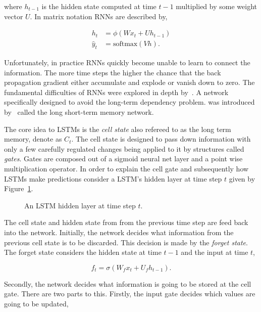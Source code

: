 where \(h_{t-1}\) is the hidden state computed at time \(t-1\) multiplied by
some weight vector \(U\). In matrix notation RNNs are described by,

\begin{align}\label{eq:recurrent_neural_network_equations}
    h_t & = \phi(Wx_t + Uh_{t-1}) \\
    \hat{y}_t & = \text{softmax}(Vh).
\end{align}

Unfortunately, in practice RNNs quickly become unable to learn to connect the
information. The more time steps the higher the chance that the back propagation
gradient either accumulate and explode or vanish down to zero. The fundamental
difficulties of RNNs were explored in depth by~\cite{Bengio1994}.
A network specifically designed to avoid the long-term dependency problem. was
introduced by~\cite{Hochreiter1997} called the long short-term memory network.

The core idea to LSTMs is the \textit{cell state} also refereed to as the
long term memory, denote as \(C_t\). The cell state is designed to pass down
information with only a few carefully regulated changes being applied to it
by structures called \textit{gates}. Gates are composed out of a sigmoid neural
net layer and a point wise multiplication operator. In order to explain
the cell gate and subsequently how LSTMs make predictions consider
a LSTM's hidden layer at time step \(t\) given by Figure~\ref{fig:lstm_cell}.

\begin{figure}[!htbp]
    \centering
    
    \caption{An LSTM hidden layer at time step \(t\).}\label{fig:lstm_cell}
\end{figure}

The cell state and hidden state from from the previous time step are feed back
into the network. Initially, the network decides what information from the
previous cell state is to be discarded. This decision is made by the
\textit{forget state}. The forget state considers the hidden state at time
\(t-1\) and the input at time \(t\),

\begin{equation}\label{eq:forget_gate}
    f_{t} = \sigma(W_{f}x_{t} + U_{f}h_{t-1}).
\end{equation}

Secondly, the network decides what information is going to be stored at the
cell gate. There are two parts to this. Firstly, the input gate decides which values
are going to be updated,

